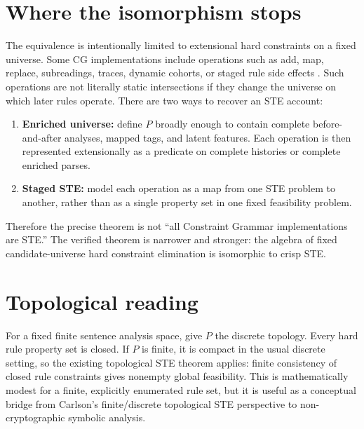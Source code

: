 \documentclass[11pt]{article}
\begin{document}
\section{Where the isomorphism stops}
The equivalence is intentionally limited to extensional hard constraints on a
fixed universe.  Some CG implementations include operations such as add, map,
replace, subreadings, traces, dynamic cohorts, or staged rule side effects
\citep{bick2015cg3}.  Such operations are not literally static intersections if
they change the universe on which later rules operate.  There are two ways to
recover an STE account:
\begin{enumerate}
\item \textbf{Enriched universe:} define $P$ broadly enough to contain complete
  before-and-after analyses, mapped tags, and latent features.  Each operation
  is then represented extensionally as a predicate on complete histories or
  complete enriched parses.
\item \textbf{Staged STE:} model each operation as a map from one STE problem to
  another, rather than as a single property set in one fixed feasibility
  problem.
\end{enumerate}
Therefore the precise theorem is not ``all Constraint Grammar implementations
are STE.''  The verified theorem is narrower and stronger: the algebra of fixed
candidate-universe hard constraint elimination is isomorphic to crisp STE.

\section{Topological reading}
For a fixed finite sentence analysis space, give $P$ the discrete topology.
Every hard rule property set is closed.  If $P$ is finite, it is compact in the
usual discrete setting, so the existing topological STE theorem applies:
finite consistency of closed rule constraints gives nonempty global feasibility.
This is mathematically modest for a finite, explicitly enumerated rule set, but
it is useful as a conceptual bridge from Carlson's finite/discrete topological
STE perspective \citep{carlson2012} to non-cryptographic symbolic analysis.
\end{document}
